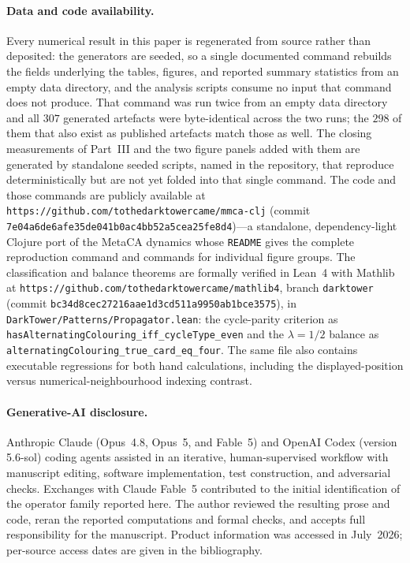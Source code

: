 \documentclass[man,12pt,floatsintext,donotrepeattitle]{apa7}
\begin{document}
\paragraph{Data and code availability.} Every numerical result in this paper is
regenerated from source rather than deposited: the generators are seeded, so a
single documented command rebuilds the fields underlying the tables, figures,
and reported summary statistics from an empty data directory, and the analysis
scripts consume no input that command does not produce. That command was run
twice from an empty data directory and all $307$ generated artefacts were
byte-identical across the two runs; the $298$ of them that also exist as
published artefacts match those as well. The closing measurements of
Part~III and the two figure panels added with them are generated by
standalone seeded scripts, named in the repository, that reproduce
deterministically but are not yet folded into that single command. The code and those
commands are publicly available at
\texttt{https://github.com/tothedarktowercame/mmca-clj} (commit
\texttt{7e04a6de6afe35de041b0ac4bb52a5cea25fe8d4})---a standalone,
dependency-light Clojure port of the MetaCA dynamics whose \texttt{README} gives
the complete reproduction command and commands for individual figure groups.
The classification and balance theorems are
formally verified in Lean~4 with Mathlib at
\texttt{https://github.com/tothedarktowercame/mathlib4}, branch \texttt{darktower}
(commit \texttt{bc34d8cec27216aae1d3cd511a9950ab1bce3575}), in
\texttt{DarkTower/Patterns/Propagator.lean}: the cycle-parity criterion as
\texttt{hasAlternatingColouring\_iff\_cycleType\_even} and the $\lambda = 1/2$
balance as \texttt{alternatingColouring\_true\_card\_eq\_four}. The same file
also contains executable regressions for both hand calculations, including the
displayed-position versus numerical-neighbourhood indexing contrast.

\paragraph{Generative-AI disclosure.} Anthropic Claude (Opus~4.8, Opus~5, and
Fable~5) and OpenAI Codex (version 5.6-sol) coding agents
\parencite{anthropic_claude,anthropic_fable,openai_codex} assisted in an
iterative, human-supervised workflow with manuscript editing, software
implementation, test construction, and adversarial checks. Exchanges with
Claude Fable~5 contributed to the initial identification of the operator family
reported here. The author reviewed the resulting prose and code, reran the
reported computations and formal checks, and accepts full responsibility for
the manuscript. Product information was accessed in July~2026; per-source
access dates are given in the bibliography.

\printbibliography
\end{document}
